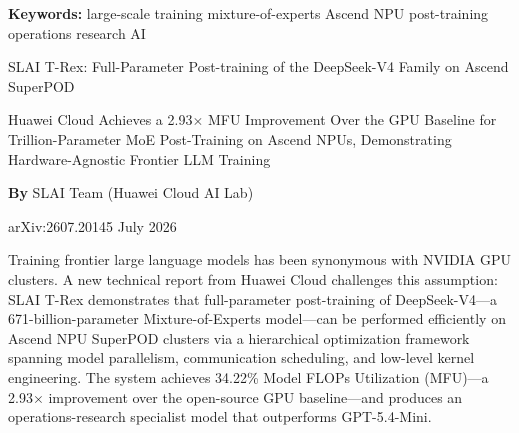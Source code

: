 \documentclass[10pt,twocolumn]{article}
\begin{document}
\setlength{\parindent}{0pt}
\setlength{\parskip}{4pt}

{\small\color{keywordgray}\textbf{Keywords:}
  large-scale training \textbullet{}
  mixture-of-experts \textbullet{}
  Ascend NPU \textbullet{}
  post-training \textbullet{}
  operations research AI}\par\vspace{4pt}

{\LARGE\bfseries\raggedright
  SLAI T-Rex: Full-Parameter Post-training of the DeepSeek-V4
  Family on Ascend SuperPOD}\par\vspace{4pt}

{\large\itshape\raggedright
  Huawei Cloud Achieves a 2.93$\times$ MFU Improvement Over the
  GPU Baseline for Trillion-Parameter MoE Post-Training on Ascend
  NPUs, Demonstrating Hardware-Agnostic Frontier LLM Training}\par\vspace{6pt}

{\small\textbf{By} SLAI Team (Huawei Cloud AI Lab)}\par\vspace{2pt}

{\small\color{keywordgray}arXiv:2607.20145 \textbullet{} July 2026}
\par\vspace{2pt}\noindent{\color{rulered}\rule{\columnwidth}{0.6pt}}\vspace{6pt}

Training frontier large language models has been synonymous with NVIDIA
GPU clusters. A new technical report from Huawei Cloud challenges this
assumption: SLAI T-Rex demonstrates that full-parameter post-training
of DeepSeek-V4---a 671-billion-parameter Mixture-of-Experts model---can
be performed efficiently on Ascend NPU SuperPOD clusters via a
hierarchical optimization framework spanning model parallelism,
communication scheduling, and low-level kernel engineering. The system
achieves 34.22\% Model FLOPs Utilization (MFU)---a 2.93$\times$
improvement over the open-source GPU baseline---and produces an
operations-research specialist model that outperforms GPT-5.4-Mini.
\end{document}
